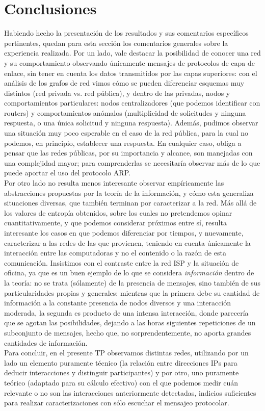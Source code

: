 \section{Conclusiones}
Habiendo hecho la presentación de los resultados y sus comentarios específicos pertinentes, quedan para esta sección los comentarios generales sobre la experiencia realizada. Por un lado, vale destacar la posibilidad de conocer una red y su comportamiento observando únicamente mensajes de protocolos de capa de enlace, sin tener en cuenta los datos transmitidos por las capas superiores: con el análisis de los grafos de red vimos cómo se pueden diferenciar esquemas muy distintos (red privada vs. red pública), y dentro de las privadas,
nodos y comportamientos particulares: nodos centralizadores (que podemos identificar con routers) y comportamientos anómalos (multiplicidad de solicitudes y ninguna respuesta, o una única solicitud y ninguna respuesta). Además, pudimos observar una situación muy poco esperable en el caso de la red pública, para la cual no podemos, en principio, establecer una respuesta.
En cualquier caso, obliga a pensar que las redes públicas, por su importancia y alcance, son manejadas con una complejidad mayor; para comprenderlas se necesitaría observar m\'as de lo que puede aportar el uso del protocolo ARP.\\

Por otro lado no resulta menos interesante observar empíricamente las abstracciones propuestas por la teoría de la información, y cómo esta generaliza situaciones diversas, que también terminan por caracterizar a la red. Más allá de los valores de entropía obtenidos, sobre los cuales no pretendemos opinar cuantitativamente, y que podemos considerar próximos entre sí, resulta interesante los casos en que podemos diferenciar por tiempos, y nuevamente, caracterizar a las redes de las que provienen, teniendo en cuenta únicamente la interacción entre las computadoras y no el contenido o la razón de esta comunicación. Insistimos con el contraste entre la red ISP y la situación de oficina, ya que es un buen ejemplo de lo que se considera \emph{información} dentro de la teoría: no se trata (sólamente) de la presencia de mensajes, sino también de sus particularidades propias y generales: mientras que la primera debe su cantidad de información a la constante presencia de nodos diversos y una interacción moderada, la segunda es producto de una intensa interacción, donde parecería que se agotan las posibilidades, dejando a las horas siguientes repeticiones de un subconjunto de mensajes, hecho que, no sorprendentemente, no aporta grandes cantidades de información.\\

Para concluir, en el presente TP observamos distintas redes, utilizando por un lado un elemento puramente técnico (la relación entre direcciones IPs para deducir interacciones y distinguir participantes) y por otro, uno puramente teórico (adaptado para su cálculo efectivo) con el que podemos medir cuán relevante o no son las interacciones anteriormente detectadas, indicios suficientes para realizar caracterizaciones con sólo escuchar el mensajeo protocolar.
